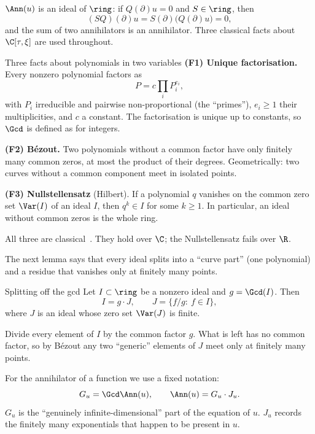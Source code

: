 $\Ann(u)$ is an ideal of $\ring$: if $Q(\partial)u=0$ and $S\in\ring$, then
\[
(SQ)(\partial)u=S(\partial)\big(Q(\partial)u\big)=0 ,
\]
and the sum of two annihilators is an annihilator. Three classical facts about $\C[\tau,\xi]$ are used throughout.

\begin{notebox}{Three facts about polynomials in two variables}
\textbf{(F1) Unique factorisation.} Every nonzero polynomial factors as
\[
P=c\prod_iP_i^{e_i},
\]
with $P_i$ irreducible and pairwise non-proportional (the ``primes''), $e_i\ge1$ their multiplicities, and $c$ a constant. The factorisation is unique up to constants, so $\Gcd$ is defined as for integers.

\textbf{(F2) B\'ezout.} Two polynomials without a common factor have only finitely many common zeros, at most the product of their degrees. Geometrically: two curves without a common component meet in isolated points.

\textbf{(F3) Nullstellensatz} (Hilbert). If a polynomial $q$ vanishes on the common zero set $\Var(I)$ of an ideal $I$, then $q^k\in I$ for some $k\ge1$. In particular, an ideal without common zeros is the whole ring.
\end{notebox}

All three are classical~\cite{clo,fu}. They hold over $\C$; the Nullstellensatz fails over $\R$.

The next lemma says that every ideal splits into a ``curve part'' (one polynomial) and a residue that vanishes only at finitely many points.

\begin{lemma}{Splitting off the gcd  \proved}\label{lem:gcd}
Let $I\subset\ring$ be a nonzero ideal and $g=\Gcd(I)$. Then
\[
I=g\cdot J,\qquad J=\{f/g:\ f\in I\},
\]
where $J$ is an ideal whose zero set $\Var(J)$ is finite.

\end{lemma}

\begin{intuition}
Divide every element of $I$ by the common factor $g$. What is left has no common factor, so by B\'ezout any two ``generic'' elements of $J$ meet only at finitely many points.
\end{intuition}

For the annihilator of a function we use a fixed notation:
\[
G_u=\Gcd\Ann(u),\qquad \Ann(u)=G_u\cdot J_u .
\]
$G_u$ is the ``genuinely infinite-dimensional'' part of the equation of $u$. $J_u$ records the finitely many exponentials that happen to be present in $u$.

